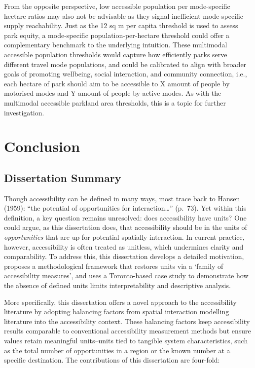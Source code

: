 \documentclass[
11pt, %
oneside, %
english, %
singlespacing, %
]{macthesis} %
\begin{document}
From the opposite perspective, low accessible population per mode-specific hectare ratios may also not be advisable as they signal inefficient mode-specific supply reachability. Just as the 12 sq m per capita threshold is used to assess park equity, a mode-specific population-per-hectare threshold could offer a complementary benchmark to the underlying intuition. These multimodal accessible population thresholds would capture how efficiently parks serve different travel mode populations, and could be calibrated to align with broader goals of promoting wellbeing, social interaction, and community connection, i.e., each hectare of park should aim to be accessible to X amount of people by motorised modes and Y amount of people by active modes. As with the multimodal accessible parkland area thresholds, this is a topic for further investigation.

\chapter*{Conclusion}\label{conclusion-1}

\section{Dissertation Summary}\label{dissertation-summary}

Though accessibility can be defined in many ways, most trace back to Hansen (1959): ``the potential of opportunities for interaction\ldots{}'' (p.~73). Yet within this definition, a key question remains unresolved: does accessibility have units? One could argue, as this dissertation does, that accessibility should be in the units of \emph{opportunities} that are up for potential spatially interaction. In current practice, however, accessibility is often treated as unitless, which undermines clarity and comparability. To address this, this dissertation develops a detailed motivation, proposes a methodological framework that restores units via a `family of accessibility measures', and uses a Toronto-based case study to demonstrate how the absence of defined units limits interpretability and descriptive analysis.

More specifically, this dissertation offers a novel approach to the accessibility literature by adopting balancing factors from spatial interaction modelling literature into the accessibility context. These balancing factors keep accessibility results comparable to conventional accessibility measurement methods but ensure values retain meaningful units--units tied to tangible system characteristics, such as the total number of opportunities in a region or the known number at a specific destination. The contributions of this dissertation are four-fold:
\end{document}
